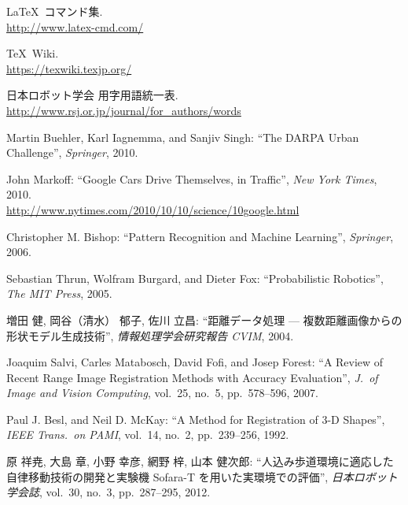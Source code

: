 \documentclass[uplatex, twocolumn, 9pt]{jsproceedings}
\begin{document}
\footnotesize
\begin{thebibliography}{99}
\LaTeX~コマンド集.\\
\url{http://www.latex-cmd.com/}

\TeX~Wiki.\\
\url{https://texwiki.texjp.org/}

日本ロボット学会 用字用語統一表.\\
\url{http://www.rsj.or.jp/journal/for_authors/words}


Martin Buehler, Karl Iagnemma, and Sanjiv Singh: ``The DARPA Urban Challenge'', \textit{Springer}, 2010.

John Markoff: ``Google Cars Drive Themselves, in Traffic'', \textit{New York Times}, 2010.\\
\url{http://www.nytimes.com/2010/10/10/science/10google.html}

Christopher M. Bishop: ``Pattern Recognition and Machine Learning'', \textit{Springer}, 2006.


Sebastian Thrun, Wolfram Burgard, and Dieter Fox: ``Probabilistic Robotics'', \textit{The MIT Press}, 2005.


増田 健, 岡谷（清水） 郁子, 佐川 立昌: ``距離データ処理 --- 複数距離画像からの形状モデル生成技術'', \textit{情報処理学会研究報告 CVIM}, 2004.

Joaquim Salvi, Carles Matabosch, David Fofi, and Josep Forest: ``A Review of Recent Range Image Registration Methods with Accuracy Evaluation'', \textit{J.\ of Image and Vision Computing}, vol.~25, no.~5, pp.~578--596, 2007.

Paul J. Besl, and Neil D. McKay: ``A Method for Registration of 3-D Shapes'', \textit{IEEE Trans.\ on PAMI}, vol.~14, no.~2, pp.~239--256, 1992.

原 祥尭, 大島 章, 小野 幸彦, 網野 梓, 山本 健次郎: ``人込み歩道環境に適応した自律移動技術の開発と実験機 Sofara-T を用いた実環境での評価'', \textit{日本ロボット学会誌}, vol.~30, no.~3, pp.~287--295, 2012.


\end{thebibliography}
\end{document}
